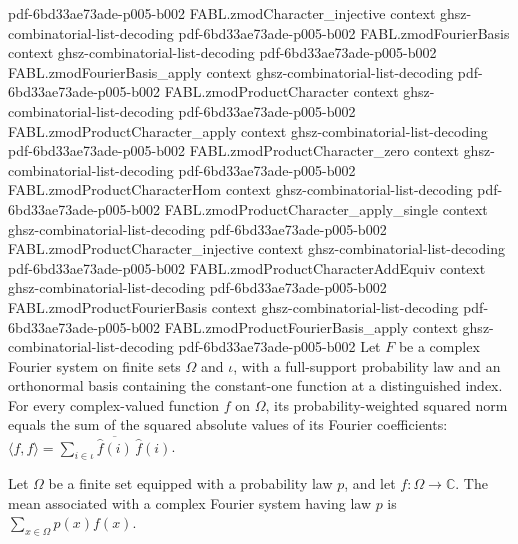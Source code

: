 \begin{theorem}
  {pdf-6bd33ae73ade-p005-b002}
\proofstep
  {FABL.zmodCharacter_injective}
  {context}
  {ghsz-combinatorial-list-decoding}
  {pdf-6bd33ae73ade-p005-b002}
\proofstep
  {FABL.zmodFourierBasis}
  {context}
  {ghsz-combinatorial-list-decoding}
  {pdf-6bd33ae73ade-p005-b002}
\proofstep
  {FABL.zmodFourierBasis_apply}
  {context}
  {ghsz-combinatorial-list-decoding}
  {pdf-6bd33ae73ade-p005-b002}
\proofstep
  {FABL.zmodProductCharacter}
  {context}
  {ghsz-combinatorial-list-decoding}
  {pdf-6bd33ae73ade-p005-b002}
\proofstep
  {FABL.zmodProductCharacter_apply}
  {context}
  {ghsz-combinatorial-list-decoding}
  {pdf-6bd33ae73ade-p005-b002}
\proofstep
  {FABL.zmodProductCharacter_zero}
  {context}
  {ghsz-combinatorial-list-decoding}
  {pdf-6bd33ae73ade-p005-b002}
\proofstep
  {FABL.zmodProductCharacterHom}
  {context}
  {ghsz-combinatorial-list-decoding}
  {pdf-6bd33ae73ade-p005-b002}
\proofstep
  {FABL.zmodProductCharacter_apply_single}
  {context}
  {ghsz-combinatorial-list-decoding}
  {pdf-6bd33ae73ade-p005-b002}
\proofstep
  {FABL.zmodProductCharacter_injective}
  {context}
  {ghsz-combinatorial-list-decoding}
  {pdf-6bd33ae73ade-p005-b002}
\proofstep
  {FABL.zmodProductCharacterAddEquiv}
  {context}
  {ghsz-combinatorial-list-decoding}
  {pdf-6bd33ae73ade-p005-b002}
\proofstep
  {FABL.zmodProductFourierBasis}
  {context}
  {ghsz-combinatorial-list-decoding}
  {pdf-6bd33ae73ade-p005-b002}
\proofstep
  {FABL.zmodProductFourierBasis_apply}
  {context}
  {ghsz-combinatorial-list-decoding}
  {pdf-6bd33ae73ade-p005-b002}
Let $F$ be a complex Fourier system on finite sets $Ω$ and $ι$, with a full-support
probability law and an orthonormal basis containing the constant-one function at a
distinguished index. For every complex-valued function $f$ on $Ω$, its
probability-weighted squared norm equals the sum of the squared absolute values of its
Fourier coefficients: $\langle f,f\rangle=\sum_{i\in ι}\overline{\widehat
f(i)}\,\widehat f(i)$.
\end{theorem}

\begin{definition}
\label{FABL.ComplexFourierSystem.mean}
\leanok
{}
Let $\Omega$ be a finite set equipped with a probability law $p$, and let
$f:\Omega\to\mathbb{C}$. The mean associated with a complex Fourier system having law
$p$ is $\sum_{x\in\Omega}p(x)f(x)$.
\end{definition}

